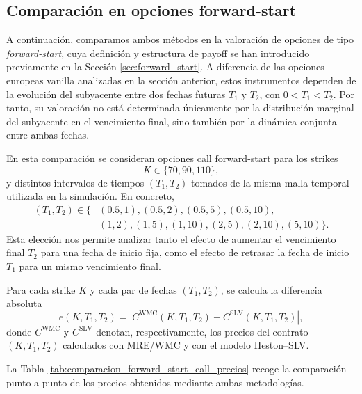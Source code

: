 \subsection{Comparación en opciones forward-start}

A continuación, comparamos ambos métodos en la valoración de opciones de tipo
\textit{forward-start}, cuya definición y estructura de payoff se han introducido
previamente en la Sección \ref{sec:forward_start}. A diferencia de las opciones
europeas vanilla analizadas en la sección anterior, estos instrumentos dependen
de la evolución del subyacente entre dos fechas futuras \(T_1\) y \(T_2\), con
\(0<T_1<T_2\). Por tanto, su valoración no está determinada únicamente por la
distribución marginal del subyacente en el vencimiento final, sino también por la dinámica conjunta entre ambas fechas.\medskip

En esta comparación se consideran opciones call forward-start para los strikes
\[
K \in \{70,90,110\},
\]
y distintos intervalos de tiempos \((T_1,T_2)\) tomados de la misma malla temporal
utilizada en la simulación. En concreto,
\[
\begin{aligned}
(T_1,T_2) \in \{&
(0.5,1),(0.5,2),(0.5,5),(0.5,10),\\
&(1,2),(1,5),(1,10),(2,5),(2,10),(5,10)\}.
\end{aligned}
\]
Esta elección nos permite analizar tanto el efecto de aumentar el vencimiento final
\(T_2\) para una fecha de inicio fija, como el efecto de retrasar la fecha de inicio
\(T_1\) para un mismo vencimiento final.\medskip

Para cada strike \(K\) y cada par de fechas \((T_1,T_2)\), se calcula la diferencia absoluta
\[
e(K,T_1,T_2)
=
\left|
C^{\mathrm{WMC}}(K,T_1,T_2)
-
C^{\mathrm{SLV}}(K,T_1,T_2)
\right|,
\]
donde \(C^{\mathrm{WMC}}\) y \(C^{\mathrm{SLV}}\) denotan, respectivamente, los
precios del contrato \((K,T_1,T_2)\) calculados con MRE/WMC y con el modelo
Heston--SLV.

La Tabla \ref{tab:comparacion_forward_start_call_precios} recoge la comparación
punto a punto de los precios obtenidos mediante ambas metodologías.

